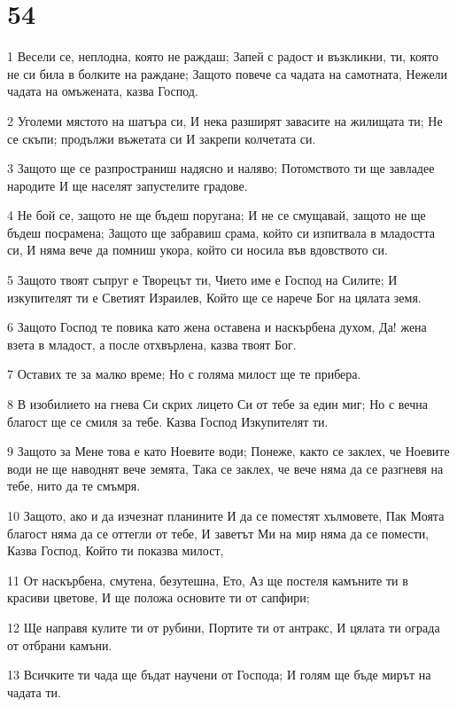 \chapter{54}

\par 1 Весели се, неплодна, която не раждаш; Запей с радост и възкликни, ти, която не си била в болките на раждане; Защото повече са чадата на самотната, Нежели чадата на омъжената, казва Господ.
\par 2 Уголеми мястото на шатъра си, И нека разширят завасите на жилищата ти; Не се скъпи; продължи въжетата си И закрепи колчетата си.
\par 3 Защото ще се разпространиш надясно и наляво; Потомството ти ще завладее народите И ще населят запустелите градове.
\par 4 Не бой се, защото не ще бъдеш поругана; И не се смущавай, защото не ще бъдеш посрамена; Защото ще забравиш срама, който си изпитвала в младостта си, И няма вече да помниш укора, който си носила във вдовството си.
\par 5 Защото твоят съпруг е Творецът ти, Чието име е Господ на Силите; И изкупителят ти е Светият Израилев, Който ще се нарече Бог на цялата земя.
\par 6 Защото Господ те повика като жена оставена и наскърбена духом, Да! жена взета в младост, а после отхвърлена, казва твоят Бог.
\par 7 Оставих те за малко време; Но с голяма милост ще те прибера.
\par 8 В изобилието на гнева Си скрих лицето Си от тебе за един миг; Но с вечна благост ще се смиля за тебе. Казва Господ Изкупителят ти.
\par 9 Защото за Мене това е като Ноевите води; Понеже, както се заклех, че Ноевите води не ще наводнят вече земята, Така се заклех, че вече няма да се разгневя на тебе, нито да те смъмря.
\par 10 Защото, ако и да изчезнат планините И да се поместят хълмовете, Пак Моята благост няма да се оттегли от тебе, И заветът Ми на мир няма да се помести, Казва Господ, Който ти показва милост,
\par 11 От наскърбена, смутена, безутешна, Ето, Аз ще постеля камъните ти в красиви цветове, И ще положа основите ти от сапфири;
\par 12 Ще направя кулите ти от рубини, Портите ти от антракс, И цялата ти ограда от отбрани камъни.
\par 13 Всичките ти чада ще бъдат научени от Господа; И голям ще бъде мирът на чадата ти.

